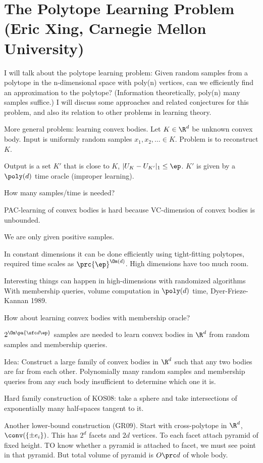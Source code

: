 \section{The Polytope Learning Problem (Eric Xing, Carnegie Mellon University)}

I will talk about the polytope learning problem: Given random samples from a polytope in the n-dimensional space with poly(n) vertices, can we efficiently find an approximation to the polytope? (Information theoretically, poly(n) many samples suffice.) I will discuss some approaches and related conjectures for this problem, and also its relation to other problems in learning theory.

More general problem: learning convex bodies. Let $K\in \R^d$ be unknown convex body. Input is uniformly random samples $x_1,x_2,\ldots \in K$. Problem is to reconstruct $K$.

Output is a set $K'$ that is close to $K$, $|U_K - U_{K'}|_1\le \ep$. $K'$ is given by a $\poly(d)$ time oracle (improper learning). 

How many samples/time is needed?

PAC-learning of convex bodies is hard because VC-dimension of convex bodies is unbounded. 

We are only given positive samples.

In constant dimensions it can be done efficiently using tight-fitting polytopes, required time scales as $\prc{\ep}^{\Om(d)}$. High dimensions have too much room. 

Interesting things can happen in high-dimensions with randomized algorithms With membership queries, volume computation in $\poly(d)$ time, Dyer-Frieze-Kannan 1989.

How about learning convex bodies with membership oracle?


$2^{\Om\pa{\sfc d\ep}}$ samples are needed to learn convex bodies in $\R^d$ from random samples and membership queries. 

Idea: Construct a large family of convex bodies in $\R^d$ such that any two bodies are far from each other. Polynomially many random samples and membership queries from any such body insufficient to determine which one it is. 

Hard family construction of KOS08: take a sphere and take intersections of exponentially many half-spaces tangent to it.

Another lower-bound construction (GR09). Start with cross-polytope in $\R^d$, $\conv(\{\pm e_i\})$.  This has $2^d$ facets and $2d$ vertices. To each  facet attach pyramid of fixed height. 
TO know whether a pyramid is attached to facet, we must see point in that pyramid. 
But total volume of pyramid is $O\prc d$ of whole body.

